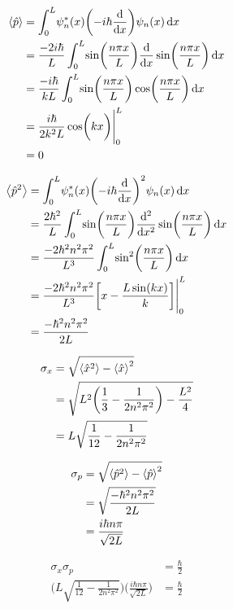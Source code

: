 \documentclass[12pt]{article}
\begin{document}
\begin{align*}
\Braket{\hat{p}} &= \int_0^L \! \psi_n^*(x) \biggl( -i\hbar\frac{\mathrm{d}}{\mathrm{d} x} \biggr) \psi_n(x) \, \mathrm{d} x \\
&= \frac{-2i\hbar}{L} \int_0^L \! \sin \biggl( {\frac{n\pi x}{L}} \biggr) \frac{\mathrm{d}}{\mathrm{d} x} \sin \biggl( {\frac{n\pi x}{L}} \biggr) \, \mathrm{d} x \\
&=  \frac{-i\hbar}{kL} \int_0^L \! \sin \biggl( {\frac{n\pi x}{L}} \biggr) \cos \biggl( {\frac{n\pi x}{L}} \biggr) \, \mathrm{d} x \\
&= \frac{i\hbar}{2k^2L} \cos \biggl ( kx \biggr ) \Bigg|_0^L \\
&= 0
\end{align*}

\begin{align*}
\Braket{\hat{p}^2} &= \int_0^L \! \psi_n^*(x) \biggl( -i\hbar\frac{\mathrm{d}}{\mathrm{d} x} \biggr)^2 \psi_n(x) \, \mathrm{d} x \\
&= \frac{2\hbar^2}{L} \int_0^L \! \sin \biggl( {\frac{n\pi x}{L}} \biggr) \frac{\mathrm{d}^2}{\mathrm{d} x^2} \sin \biggl( {\frac{n\pi x}{L}} \biggr) \, \mathrm{d} x \\
&= \frac{-2\hbar^2n^2\pi^2}{L^3} \int_0^L \! \sin^2 \biggl( {\frac{n\pi x}{L}} \biggr) \, \mathrm{d} x \\
&= \frac{-2\hbar^2n^2\pi^2}{L^3} \biggl [x - \frac{L \sin ( kx )}{k} \biggr ] \Bigg|_0^L \\
&= \frac{-\hbar^2n^2\pi^2}{2L}
\end{align*}

\begin{align*}
\sigma_x &= \sqrt{\Braket{\hat{x}^2} - \Braket{\hat{x}}^2} \\
&= \sqrt{L^2 \biggl(\frac{1}{3} - \frac{1}{2n^2\pi^2} \biggr) - \frac{L^2}{4}} \\
&= L\sqrt{\frac{1}{12} - \frac{1}{2n^2\pi^2}}
\end{align*}

\begin{align*}
\sigma_p &= \sqrt{\Braket{\hat{p}^2} - \Braket{\hat{p}}^2} \\
&= \sqrt{\frac{-\hbar^2n^2\pi^2}{2L}} \\
&= \frac{i\hbar n \pi}{\sqrt{2L}}
\end{align*}

\begin{align*}
\sigma_x \sigma_p &= \frac{\hbar}{2} \\
\biggl(L\sqrt{\frac{1}{12} - \frac{1}{2n^2\pi^2}}\biggr) \biggl(\frac{i\hbar n \pi}{\sqrt{2L}}\biggr) &= \frac{\hbar}{2}
\end{align*}
\end{document}
